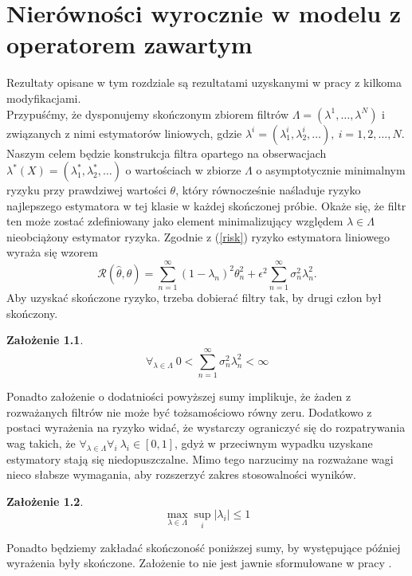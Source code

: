 \documentclass[man,mfiu]{mgrwms}
\newtheorem{za}{Założenie}[chapter]
\begin{document}
\chapter{Nierówności wyrocznie w modelu z operatorem zawartym}\label{G1}
Rezultaty opisane w tym rozdziale są rezultatami uzyskanymi w pracy \cite{cavalier1} z kilkoma modyfikacjami.\\
\indent Przypuśćmy, że dysponujemy skończonym zbiorem filtrów $\Lambda=(\lambda^1,\dots, \lambda^N)$ i związanych z nimi estymatorów liniowych, gdzie $\lambda^i=(\lambda^i_1,\lambda^i_2,\dots),\ i=1,2,\dots, N$. Naszym celem będzie konstrukcja filtra opartego na obserwacjach $\lambda^*(X)=(\lambda^*_1,\lambda^*_2,\dots)$ o wartościach w zbiorze $\Lambda$ o asymptotycznie minimalnym ryzyku przy prawdziwej wartości $\theta$, który równocześnie naśladuje ryzyko najlepszego estymatora w tej klasie w każdej skończonej próbie. Okaże się, że filtr ten może zostać zdefiniowany jako element minimalizujący względem $\lambda \in \Lambda$ nieobciążony estymator ryzyka. Zgodnie z (\ref{risk}) ryzyko estymatora liniowego wyraża się wzorem
\begin{displaymath}
\mathcal{R}(\hat{\theta},\theta)=\sum_{n=1}^{\infty}(1-\lambda_n)^2\theta_n^2+\epsilon^2\sum_{n=1}^{\infty}\sigma_n^2\lambda_n^2.
\end{displaymath}
Aby uzyskać skończone ryzyko, trzeba dobierać filtry tak, by drugi człon był skończony.
\begin{za}
\begin{displaymath}\label{ass1}
\forall_{\lambda\in \Lambda}\ 0<\sum_{n=1}^{\infty}\sigma_n^2\lambda_n^2<\infty
\end{displaymath}
\end{za}
Ponadto założenie o dodatniości powyższej sumy implikuje, że żaden z rozważanych filtrów nie może być tożsamościowo równy zeru.
Dodatkowo z postaci wyrażenia na ryzyko widać, że wystarczy ograniczyć się do rozpatrywania wag takich, że $\forall_{\lambda\in \Lambda}\forall_i\ \lambda_i\in [0,1]$, gdyż w przeciwnym wypadku uzyskane estymatory stają się niedopuszczalne. Mimo tego narzucimy na rozważane wagi nieco słabsze wymagania, aby rozszerzyć zakres stosowalności wyników.
\begin{za}
\begin{displaymath}\label{ass2}
\max_{\lambda\in \Lambda}\sup_i|\lambda_i|\leq 1
\end{displaymath}
\end{za}
\indent Ponadto będziemy zakładać skończoność poniższej sumy, by występujące później wyrażenia były skończone. Założenie to nie jest jawnie sformułowane w pracy \cite{cavalier1}.
\end{document}
